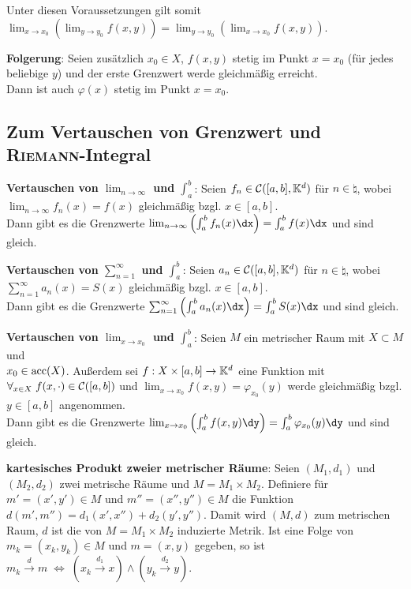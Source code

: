 Unter diesen Voraussetzungen gilt somit
$\lim_{x \to x_0} \left(\lim_{y \to y_0} f(x, y)\right) =
\lim_{y \to y_0} \left(\lim_{x \to x_0} f(x, y)\right)$.

\textbf{Folgerung}:
Seien zusätzlich $x_0 \in X$, $f(x, y)$ stetig im Punkt
$x = x_0$ (für jedes beliebige $y$) und der erste Grenzwert werde gleichmäßig
erreicht. \\
Dann ist auch $\varphi(x)$ stetig im Punkt $x = x_0$.

\subsection{%
    Zum Vertauschen von Grenzwert und \textsc{Riemann}-Integral%
}

\textbf{Vertauschen von $\lim_{n \to \infty}$ und $\int_a^b$}:
Seien $f_n \in \mathcal{C}([a,b], \mathbb{K}^d)$ für $n \in \natural$, wobei \\
$\lim_{n \to \infty} f_n(x) = f(x)$ gleichmäßig bzgl. $x \in [a,b]$. \\
Dann gibt es die Grenzwerte
$\lim_{n \to \infty} \left(\int_a^b f_n(x)\dx\right) = \int_a^b f(x)\dx$
und sind gleich.

\textbf{Vertauschen von $\sum_{n=1}^\infty$ und $\int_a^b$}:
Seien $a_n \in \mathcal{C}([a,b], \mathbb{K}^d)$ für $n \in \natural$, wobei \\
$\sum_{n=1}^\infty a_n(x) = S(x)$ gleichmäßig bzgl. $x \in [a,b]$. \\
Dann gibt es die Grenzwerte
$\sum_{n=1}^\infty \left(\int_a^b a_n(x)\dx\right) = \int_a^b S(x)\dx$
und sind gleich.

\textbf{Vertauschen von $\lim_{x \to x_0}$ und $\int_a^b$}:
Seien $M$ ein metrischer Raum mit $X \subset M$ und \\
$x_0 \in \operatorname{acc}(X)$.
Außerdem sei $f: X \times [a,b] \rightarrow \mathbb{K}^d$ eine Funktion mit
$\forall_{x \in X}\; f(x, \cdot) \in \mathcal{C}([a,b])$ und
$\lim_{x \to x_0} f(x, y) = \varphi_{x_0}(y)$ werde gleichmäßig bzgl.
$y \in [a,b]$ angenommen. \\
Dann gibt es die Grenzwerte
$\lim_{x \to x_0} \left(\int_a^b f(x, y)\dy\right) =
\int_a^b \varphi_{x_0}(y)\dy$
und sind gleich.

\linie

\textbf{kartesisches Produkt zweier metrischer Räume}:
Seien $(M_1, d_1)$ und $(M_2, d_2)$ zwei metrische Räume und
$M = M_1 \times M_2$.
Definiere für $m' = (x', y') \in M$ und $m'' = (x'', y'') \in M$
die Funktion $d(m', m'') = d_1(x', x'') + d_2(y', y'')$.
Damit wird $(M, d)$ zum metrischen Raum,
$d$ ist die von $M = M_1 \times M_2$ induzierte Metrik.
Ist eine Folge von $m_k = (x_k, y_k) \in M$ und $m = (x, y)$ gegeben,
so ist $m_k \xrightarrow{d} m \;\Leftrightarrow\;
(x_k \xrightarrow{d_1} x) \land (y_k \xrightarrow{d_2} y)$.

